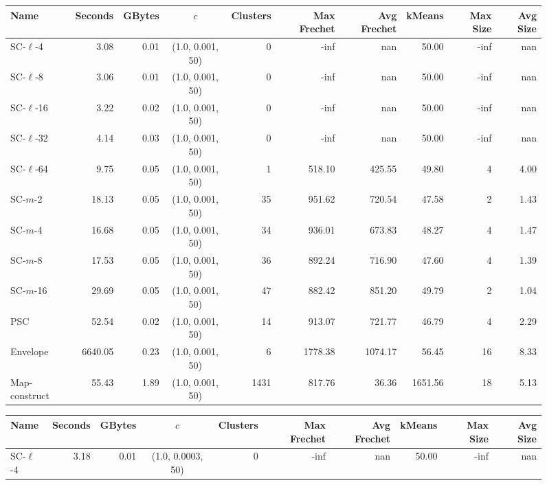 \begin{figure} \begin{center}
    \begin{minipage}{\textwidth}
    {
    \begin{tabular}{@{}lrrcrrrrrr@{}}
        \toprule
        Name & Seconds & GBytes & $c$ & Clusters & Max Frechet & Avg Frechet & kMeans & Max Size & Avg Size\\
        \midrule
        SC-$\ell$-4 & 3.08 & 0.01 & (1.0, 0.001, 50) & 0 & -inf & nan & 50.00 & -inf & nan\\
        SC-$\ell$-8 & 3.06 & 0.01 & (1.0, 0.001, 50) & 0 & -inf & nan & 50.00 & -inf & nan\\
        SC-$\ell$-16 & 3.22 & 0.02 & (1.0, 0.001, 50) & 0 & -inf & nan & 50.00 & -inf & nan\\
        SC-$\ell$-32 & 4.14 & 0.03 & (1.0, 0.001, 50) & 0 & -inf & nan & 50.00 & -inf & nan\\
        SC-$\ell$-64 & 9.75 & 0.05 & (1.0, 0.001, 50) & 1 & 518.10 & 425.55 & 49.80 & 4 & 4.00\\
        SC-$m$-2 & 18.13 & 0.05 & (1.0, 0.001, 50) & 35 & 951.62 & 720.54 & 47.58 & 2 & 1.43\\
        SC-$m$-4 & 16.68 & 0.05 & (1.0, 0.001, 50) & 34 & 936.01 & 673.83 & 48.27 & 4 & 1.47\\
        SC-$m$-8 & 17.53 & 0.05 & (1.0, 0.001, 50) & 36 & 892.24 & 716.90 & 47.60 & 4 & 1.39\\
        SC-$m$-16 & 29.69 & 0.05 & (1.0, 0.001, 50) & 47 & 882.42 & 851.20 & 49.79 & 2 & 1.04\\
        PSC & 52.54 & 0.02 & (1.0, 0.001, 50) & 14 & 913.07 & 721.77 & 46.79 & 4 & 2.29\\
        Envelope & 6640.05 & 0.23 & (1.0, 0.001, 50) & 6 & 1778.38 & 1074.17 & 56.45 & 16 & 8.33\\
        Map-construct & 55.43 & 1.89 & (1.0, 0.001, 50) & 1431 & 817.76 & 36.36 & 1651.56 & 18 & 5.13\\
        \bottomrule
    \end{tabular}
    }
    {
    \begin{tabular}{@{}lrrcrrrrrr@{}}
        \toprule
        Name & Seconds & GBytes & $c$ & Clusters & Max Frechet & Avg Frechet & kMeans & Max Size & Avg Size\\
        \midrule
        SC-$\ell$-4 & 3.18 & 0.01 & (1.0, 0.0003, 50) & 0 & -inf & nan & 50.00 & -inf & nan\\

\end{tabular}}
\end{minipage}
\end{center}
\end{figure}
